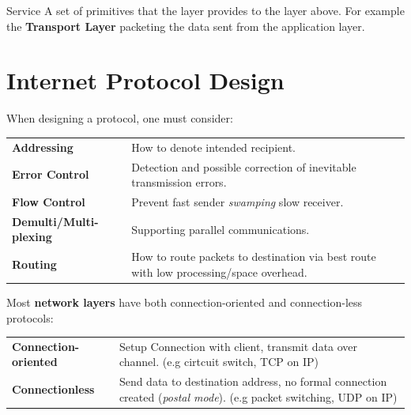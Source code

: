 \begin{definitionbox}{Service}
    A set of primitives that the layer provides to the layer above. For example the \textbf{Transport Layer} packeting the data sent from the application layer.
\end{definitionbox}

\section{Internet Protocol Design}
When designing a protocol, one must consider:

\begin{tabular}{l p{}}
    \textbf{Addressing}            & How to denote intended recipient.                                                      \\
    \textbf{Error Control}         & Detection and possible correction of inevitable transmission errors.                   \\
    \textbf{Flow Control}          & Prevent fast sender \textit{swamping} slow receiver.                                   \\
    \textbf{Demulti/Multi-plexing} & Supporting parallel communications.                                                    \\
    \textbf{Routing}               & How to route packets to destination via best route with low processing/space overhead. \\
\end{tabular}

Most \textbf{network layers} have both connection-oriented and connection-less protocols:
\begin{center}
    \begin{tabular}{l p{}}
        \textbf{Connection-oriented} & Setup Connection with client, transmit data over channel. (e.g cirtcuit switch, TCP on IP)                               \\
        \textbf{Connectionless}      & Send data to destination address, no formal connection created (\textit{postal mode}). (e.g packet switching, UDP on IP) \\
    \end{tabular}
\end{center}

